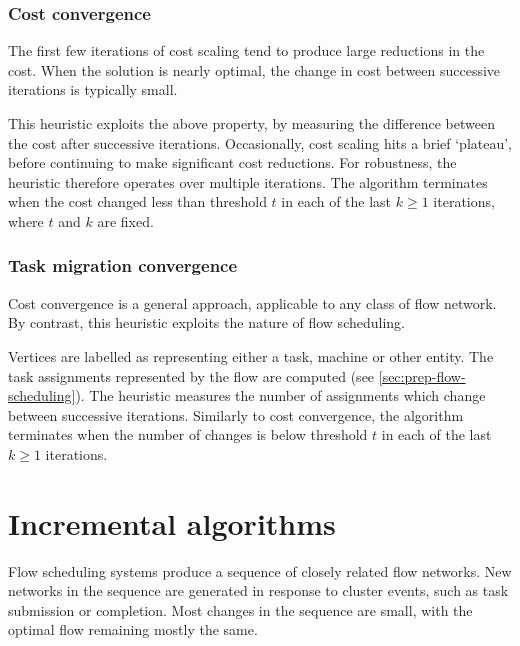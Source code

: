 \subsubsection{Cost convergence}

The first few iterations of cost scaling tend to produce large reductions in the cost. When the solution is nearly optimal, the change in cost between successive iterations is typically small.

This heuristic exploits the above property, by measuring the difference between the cost after successive iterations. Occasionally, cost scaling hits a brief `plateau', before continuing to make significant cost reductions. For robustness, the heuristic therefore operates over multiple iterations. The algorithm terminates when the cost changed less than threshold $t$ in each of the last $k \geq 1$ iterations, where $t$ and $k$ are fixed.

\subsubsection{Task migration convergence}

Cost convergence is a general approach, applicable to any class of flow network. By contrast, this heuristic exploits the nature of flow scheduling.

Vertices are labelled as representing either a task, machine or other entity. The task assignments represented by the flow are computed (see \cref{sec:prep-flow-scheduling}). The heuristic measures the number of assignments which change between successive iterations. Similarly to cost convergence, the algorithm terminates when the number of changes is below threshold $t$ in each of the last $k \geq 1$ iterations.


\section{Incremental algorithms} \label{sec:impl-incremental}


Flow scheduling systems produce a sequence of closely related flow networks. New networks in the sequence are generated in response to cluster events, such as task submission or completion. Most changes in the sequence are small, with the optimal flow remaining mostly the same.

